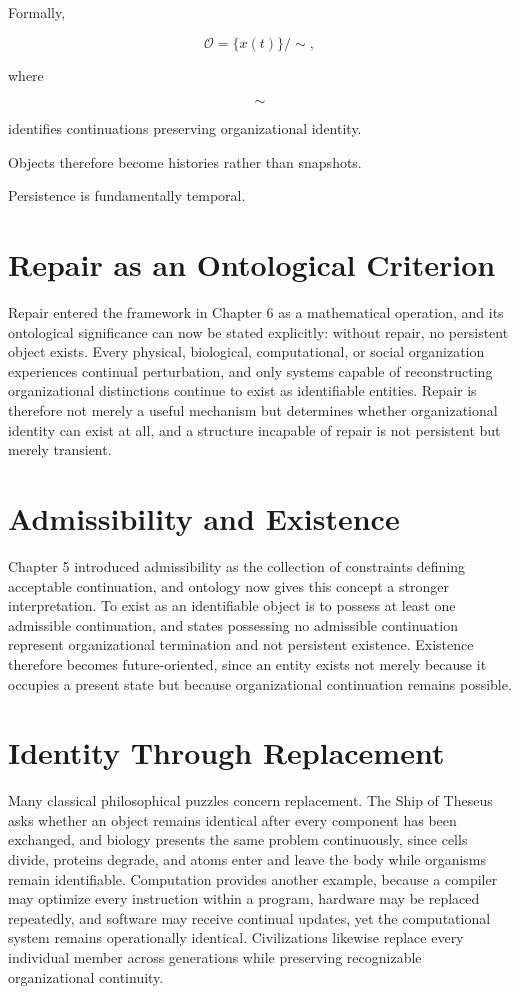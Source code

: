 \documentclass[11pt,oneside]{book}
\numberwithin{equation}{chapter}
\theoremstyle{definition}
\theoremstyle{plain}
\begin{document}
Formally,

\[
\mathcal O
=
\{x(t)\}
/
\sim,
\]

where

\[
\sim
\]

identifies continuations preserving organizational identity.

Objects therefore become histories rather than snapshots.

Persistence is fundamentally temporal.

\section{Repair as an Ontological Criterion}

Repair entered the framework in Chapter 6 as a mathematical operation, and its ontological significance can now be stated explicitly: without repair, no persistent object exists. Every physical, biological, computational, or social organization experiences continual perturbation, and only systems capable of reconstructing organizational distinctions continue to exist as identifiable entities. Repair is therefore not merely a useful mechanism but determines whether organizational identity can exist at all, and a structure incapable of repair is not persistent but merely transient.

\section{Admissibility and Existence}

Chapter 5 introduced admissibility as the collection of constraints defining acceptable continuation, and ontology now gives this concept a stronger interpretation. To exist as an identifiable object is to possess at least one admissible continuation, and states possessing no admissible continuation represent organizational termination and not persistent existence. Existence therefore becomes future-oriented, since an entity exists not merely because it occupies a present state but because organizational continuation remains possible.

\section{Identity Through Replacement}

Many classical philosophical puzzles concern replacement. The Ship of Theseus asks whether an object remains identical after every component has been exchanged, and biology presents the same problem continuously, since cells divide, proteins degrade, and atoms enter and leave the body while organisms remain identifiable. Computation provides another example, because a compiler may optimize every instruction within a program, hardware may be replaced repeatedly, and software may receive continual updates, yet the computational system remains operationally identical. Civilizations likewise replace every individual member across generations while preserving recognizable organizational continuity.
\end{document}
